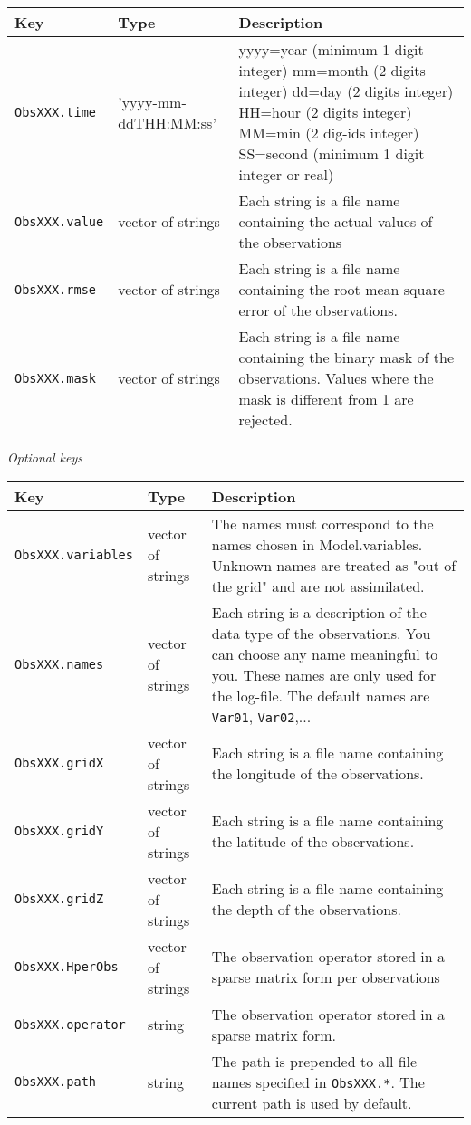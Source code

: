 \documentclass[a4paper,12pt]{article}
\newcommand{\code}{\texttt}
\newenvironment{keytabular}{\begin{tabular}{|p{0.3\textwidth}|p{0.2\textwidth}|p{0.5\textwidth}|} \hline Key & Type & Description \\ \hline \hline }{\end{tabular}}
\newcommand{\subsubsubsection}[1]{\bigskip \textit{#1} \medskip}
\begin{document}
\begin{keytabular}
\code{ObsXXX.time} & 'yyyy-mm-ddTHH:MM:ss' &
  yyyy=year  (minimum 1 digit integer)
  mm=month (2 digits integer)
  dd=day   (2 digits integer)
  HH=hour (2 digits integer)
  MM=min  (2 dig-ids integer)
  SS=second (minimum 1 digit integer or real)
\\  
\code{ObsXXX.value} & vector of strings & Each string is a file name containing
  the actual values of the observations
\\
\code{ObsXXX.rmse} & vector of strings & Each string is a file name containing 
  the root mean square error of the observations.
\\
\code{ObsXXX.mask} & vector of strings & Each string is a file name containing 
  the binary mask of the observations. Values where the mask is different
  from 1 are rejected.
\\
\hline
\end{keytabular}

\subsubsubsection{Optional keys}

\begin{keytabular}
\code{ObsXXX.variables} & vector of strings & The names must correspond to the names 
  chosen in Model.variables. Unknown names are treated as "out of the grid"
  and are not assimilated.
\\
\code{ObsXXX.names} & vector of strings & Each string is a description of 
the data type of the observations. You can choose any name meaningful 
to you. These names are only used for the log-file. The default names 
are \code{Var01}, \code{Var02},...
\\
\code{ObsXXX.gridX} & vector of strings & Each string is a file name containing 
  the longitude of the observations.
\\
\code{ObsXXX.gridY} & vector of strings & Each string is a file name containing 
  the latitude of the observations.
\\
\code{ObsXXX.gridZ} & vector of strings & Each string is a file name containing 
  the depth of the observations.
\\
\code{ObsXXX.HperObs} & vector of strings & The observation operator stored in a 
   sparse matrix form per observations
\\
\code{ObsXXX.operator} & string & The observation operator stored in a 
   sparse matrix form.   
\\
\code{ObsXXX.path} & string & The path is prepended to all file names
specified in \code{ObsXXX.*}. The current path is used by default.
\\
\hline
\end{keytabular}
\end{document}
